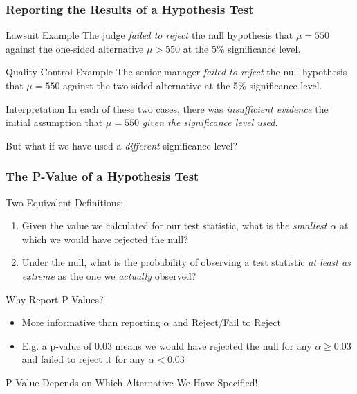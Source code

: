 \documentclass[handout]{beamer}
\begin{document}
\begin{frame}
	\frametitle{Reporting the Results of a Hypothesis Test}
	\begin{block}
		{Lawsuit Example}
		The judge \emph{failed to reject} the null hypothesis that $\mu = 550$ against the one-sided alternative $\mu > 550$ at the 5\% significance level.
	\end{block}
	\begin{block}
		{Quality Control Example}
		The senior manager \emph{failed to reject} the null hypothesis that $\mu =550$ against the two-sided alternative at the 5\% significance level.
	\end{block}
	\begin{block}
		{Interpretation}
		In each of these two cases, there was \emph{insufficient evidence} the initial assumption that $\mu = 550$ \emph{given the significance level used}.
	\end{block}
	\alert{But what if we have used a \emph{different} significance level?}
\end{frame}
\begin{frame}
	\frametitle{The P-Value of a Hypothesis Test}
	\begin{block}
		{Two Equivalent Definitions:}
		\begin{enumerate}
			\item Given the value we calculated for our test statistic, what is the \emph{smallest $\alpha$} at which we would have rejected the null?
			\item Under the null, what is the probability of observing a test statistic \emph{at least as extreme} as the one we \emph{actually} observed?
		\end{enumerate}
	\end{block}
	\begin{block}
		{Why Report P-Values?}
		\begin{itemize}
			\item More informative than reporting $\alpha$ and Reject/Fail to Reject
			\item E.g. a p-value of 0.03 means we would have rejected the null for any $\alpha \geq 0.03$ and failed to reject it for any $\alpha < 0.03$ 
		\end{itemize}
	\end{block}
\end{frame}

\begin{frame}
\begin{center}
\huge P-Value Depends on Which Alternative We Have Specified!
\end{center}
\end{frame}
\end{document}

